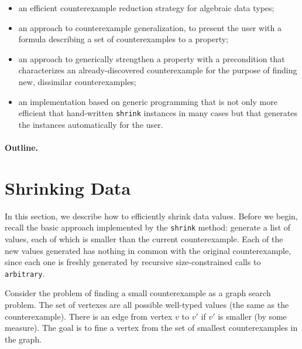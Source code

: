 \documentclass[10pt]{sigplanconf}
\newcommand{\ttp}[1]{\texttt{#1}}
\begin{document}
\begin{itemize}

\item an efficient counterexample reduction strategy for algebraic
  data types;

\item an approach to counterexample generalization, to present the
  user with a formula describing a set of counterexamples to a property;

\item an approach to generically strengthen a property with a precondition that
  characterizes an already-discovered counterexample for the purpose of finding
  new, dissimilar counterexamples;

\item an implementation based on generic programming that is not only more
  efficient that hand-written \ttp{shrink} instances in many cases but that
  generates the instances automatically for the user.

\end{itemize}


\paragraph{Outline.}




\section{Shrinking Data}
In this section, we describe how to efficiently shrink data values.  Before we
begin, recall the basic approach implemented by the \ttp{shrink} method:
generate a list of values, each of which is smaller than the current
counterexample.  Each of the new values generated has nothing in common with the
original counterexample, since each one is freshly generated by recursive
size-constrained calls to \ttp{arbitrary}.

Consider the problem of finding a small counterexample as a graph search
problem.  The set of vertexes are all possible well-typed values (the same as
the counterexample).  There is an edge from vertex $v$ to $v'$ if $v'$ is
smaller (by some measure).  The goal is to fine a vertex from the set of
smallest counterexamples in the graph.
\end{document}

